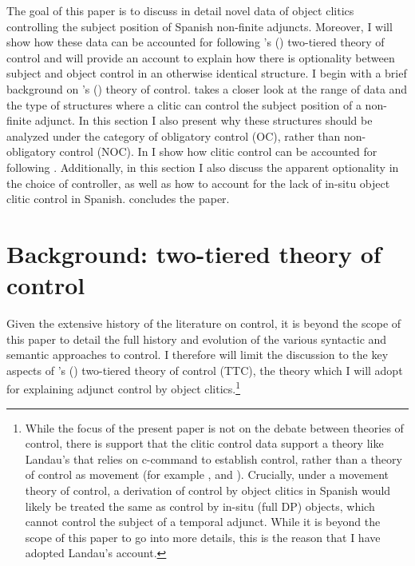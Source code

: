 \documentclass[output=paper,colorlinks,citecolor=brown]{langscibook}
\begin{document}
The goal of this paper is to discuss in detail novel data of object clitics controlling the subject position of Spanish non-finite adjuncts. Moreover, I will show how these data can be accounted for following \citeauthor{landau2015}'s (\citeyear{landau2015}) two-tiered theory of control and will provide an account to explain how there is optionality between subject and object control in an otherwise identical structure. I begin  with a brief background on \citeauthor{landau2015}'s (\citeyear{landau2015}) theory of control.  takes a closer look at the range of data and the type of structures where a clitic can control the subject position of a non-finite adjunct. In this section I also present why these structures should be analyzed under the category of obligatory control (OC), rather than non-obligatory control (NOC). In  I show how clitic control can be accounted for following \citet{landau2015}. Additionally, in this section I also discuss the apparent optionality in the choice of controller, as well as how to account for the lack of in-situ object clitic control in Spanish.  concludes the paper.

\section{Background:  two-tiered theory of control} \label{Section 2}

Given the extensive history of the literature on control, it is beyond the scope of this paper to detail the full history and evolution of the various syntactic and semantic approaches to control. I therefore will limit the discussion to the key aspects of \citeauthor{landau2015}'s (\citeyear{landau2015}) two-tiered theory of control (TTC), the theory which I will adopt for explaining adjunct control by object clitics.\footnote{While the focus of the present paper is not on the debate between theories of control, there is support that the clitic control data support a theory like Landau’s that relies on c-command to establish control, rather than a theory of control as movement (for example \citealt{hornstein1999}, \citeyear{hornstein2000} and \citealt{boeckx2010}). Crucially, under a movement theory of control, a derivation of control by object clitics in Spanish would likely be treated the same as control by in-situ (full DP) objects, which cannot control the subject of a temporal adjunct. While it is beyond the scope of this paper to go into more details, this is the reason that I have adopted Landau’s account.}
\end{document}
